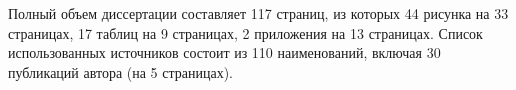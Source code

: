 Полный объем диссертации составляет 117 страниц, из которых 44 рисунка на 33 страницах, 17 таблиц на 9 страницах, 2 приложения на 13 страницах. Список использованных источников состоит из 110 наименований, включая 30 публикаций автора (на 5 страницах).




%
